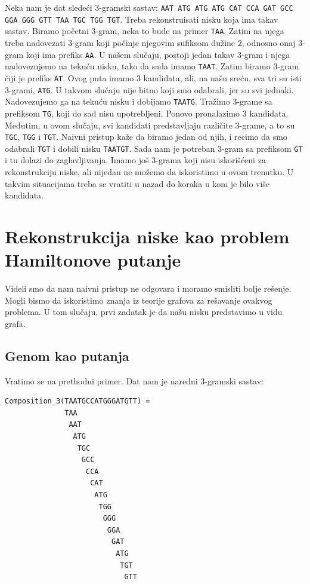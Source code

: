 Neka nam je dat sledeći 3-gramski sastav: \texttt{AAT ATG ATG ATG CAT CCA GAT GCC GGA GGG GTT TAA TGC TGG TGT}. Treba rekonstruisati nisku koja ima takav sastav. Biramo početni 3-gram, neka to bude na primer \texttt{TAA}. Zatim na njega treba nadovezati 3-gram koji počinje njegovim sufiksom dužine 2, odnosno onaj 3-gram koji ima prefiks \texttt{AA}. U našem slučaju, postoji jedan takav 3-gram i njega nadovezujemo na tekuću nisku, tako da sada imamo \texttt{TAAT}. Zatim biramo 3-gram čiji je prefiks \texttt{AT}. Ovog puta imamo 3 kandidata, ali, na našu sreću, sva tri su isti 3-grami, \texttt{ATG}. U takvom slučaju nije bitno koji smo odabrali, jer su svi jednaki. Nadovezujemo ga na tekuću nisku i dobijamo \texttt{TAATG}. Tražimo 3-grame sa prefiksom \texttt{TG}, koji do sad nisu upotrebljeni. Ponovo pronalazimo 3 kandidata. Međutim, u ovom slučaju, svi kandidati predstavljaju različite 3-grame, a to su \texttt{TGC}, \texttt{TGG} i \texttt{TGT}. Naivni pristup kaže da biramo jedan od njih, i recimo da smo odabrali \texttt{TGT} i dobili nisku \texttt{TAATGT}. Sada nam je potreban 3-gram sa prefiksom \texttt{GT} i tu dolazi do zaglavljivanja. Imamo još 3-grama koji nisu iskorišćeni za rekonstrukciju niske, ali nijedan ne možemo da iskoristimo u ovom trenutku. U takvim situacijama treba se vratiti u nazad do koraka u kom je bilo više kandidata.

\section{Rekonstrukcija niske kao problem Hamiltonove putanje}

Videli smo da nam naivni pristup ne odgovara i moramo smisliti bolje rešenje. Mogli bismo da iskoristimo znanja iz teorije grafova za rešavanje ovakvog problema. U tom slučaju, prvi zadatak je da našu nisku predstavimo u vidu grafa.

\subsection{Genom kao putanja}

Vratimo se na prethodni primer. Dat nam je naredni 3-gramski sastav:
\begin{lstlisting}
Composition_3(TAATGCCATGGGATGTT) =
              TAA 
               AAT 
                ATG
                 TGC
                  GCC
                   CCA
                    CAT
                     ATG
                      TGG
                       GGG
                        GGA
                         GAT
                          ATG
                           TGT
                            GTT
\end{lstlisting}


